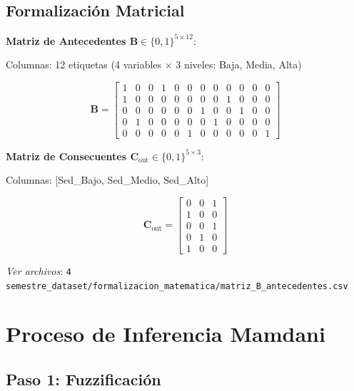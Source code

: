 \documentclass[12pt,letterpaper,twoside]{report}
\newcommand{\mat}[1]{\mathbf{#1}}
\begin{document}
\subsection{Formalización Matricial}

\begin{calculobox}
\textbf{Matriz de Antecedentes $\mat{B} \in \{0,1\}^{5 \times 12}$}:

Columnas: 12 etiquetas (4 variables $\times$ 3 niveles: Baja, Media, Alta)

\begin{equation*}
\mat{B} = 
\begin{bmatrix}
1 & 0 & 0 & 1 & 0 & 0 & 0 & 0 & 0 & 0 & 0 & 0 \\
1 & 0 & 0 & 0 & 0 & 0 & 0 & 0 & 1 & 0 & 0 & 0 \\
0 & 0 & 0 & 0 & 0 & 0 & 1 & 0 & 0 & 1 & 0 & 0 \\
0 & 1 & 0 & 0 & 0 & 0 & 0 & 1 & 0 & 0 & 0 & 0 \\
0 & 0 & 0 & 0 & 0 & 1 & 0 & 0 & 0 & 0 & 0 & 1
\end{bmatrix}
\end{equation*}

\textbf{Matriz de Consecuentes $\mat{C}_{\text{out}} \in \{0,1\}^{5 \times 3}$}:

Columnas: [Sed\_Bajo, Sed\_Medio, Sed\_Alto]

\begin{equation*}
\mat{C}_{\text{out}} = 
\begin{bmatrix}
0 & 0 & 1 \\
1 & 0 & 0 \\
0 & 0 & 1 \\
0 & 1 & 0 \\
1 & 0 & 0
\end{bmatrix}
\end{equation*}
\end{calculobox}

\textit{Ver archivos}: \texttt{4 semestre\_dataset/formalizacion\_matematica/matriz\_B\_antecedentes.csv}

\section{Proceso de Inferencia Mamdani}

\subsection{Paso 1: Fuzzificación}
\end{document}
